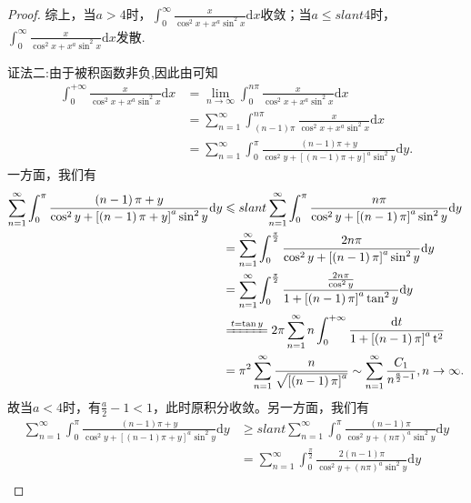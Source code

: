 \documentclass[../../main.tex]{subfiles}
\begin{document}
\begin{proof}
综上，当$a>4$时，$\int_0^{\infty}\frac{x}{\cos^2x+x^a\sin^2x}\mathrm{d}x$收敛；当$a\leqslant slant 4$时，$\int_0^{\infty}\frac{x}{\cos^2x+x^a\sin^2x}\mathrm{d}x$发散.

{\color{blue}证法二:}由于被积函数非负,因此由可知
\begin{align*}
\int_0^{+\infty}{\frac{x}{\cos ^2x+x^a\sin ^2x}\mathrm{d}x}&=\underset{n\rightarrow \infty}{\lim}\int_0^{n\pi}{\frac{x}{\cos ^2x+x^a\sin ^2x}\mathrm{d}x}
\\
&=\sum_{n=1}^{\infty}{\int_{\left( n-1 \right) \pi}^{n\pi}{\frac{x}{\cos ^2x+x^a\sin ^2x}\mathrm{d}x}}
\\
&=\sum_{n=1}^{\infty}{\int_0^{\pi}{\frac{\left( n-1 \right) \pi +y}{\cos ^2y+\left[ \left( n-1 \right) \pi +y \right] ^a\sin ^2y}\mathrm{d}y}}.
\end{align*}
一方面，我们有
\begin{align*}
\sum_{n=1}^{\infty}{\int_0^{\pi}{\frac{\left( n-1 \right) \pi +y}{\cos ^2y+\left[ \left( n-1 \right) \pi +y \right] ^a\sin ^2y}\mathrm{d}y}}&\leqslant slant \sum_{n=1}^{\infty}{\int_0^{\pi}{\frac{n\pi}{\cos ^2y+\left[ \left( n-1 \right) \pi \right] ^a\sin ^2y}\mathrm{d}y}}\\
&=\sum_{n=1}^{\infty}{\int_0^{\frac{\pi}{2}}{\frac{2n\pi}{\cos ^2y+\left[ \left( n-1 \right) \pi \right] ^a\sin ^2y}\mathrm{d}y}}\\
&=\sum_{n=1}^{\infty}{\int_0^{\frac{\pi}{2}}{\frac{\frac{2n\pi}{\cos ^2y}}{1+\left[ \left( n-1 \right) \pi \right] ^a\tan ^2y}\mathrm{d}y}}
\\
&\xlongequal{t=\tan y}2\pi \sum_{n=1}^{\infty}{n\int_0^{+\infty}{\frac{\mathrm{d}t}{1+\left[ \left( n-1 \right) \pi \right] ^a\mathrm{t}^2}}}\\
&=\pi ^2\sum_{n=1}^{\infty}{\frac{n}{\sqrt{\left[ \left( n-1 \right) \pi \right] ^a}}}\sim \sum_{n=1}^{\infty}{\frac{C_1}{n^{\frac{a}{2}-1}}},n\rightarrow \infty .
\end{align*}
故当$a<4$时，有$\frac{a}{2}-1<1$，此时原积分收敛。另一方面，我们有
\begin{align*}
\sum_{n=1}^{\infty}{\int_0^{\pi}{\frac{\left( n-1 \right) \pi +y}{\cos ^2y+\left[ \left( n-1 \right) \pi +y \right] ^a\sin ^2y}\mathrm{d}y}}&\geqslant slant \sum_{n=1}^{\infty}{\int_0^{\pi}{\frac{\left( n-1 \right) \pi}{\cos ^2y+\left( n\pi \right) ^a\sin ^2y}\mathrm{d}y}}\\
&=\sum_{n=1}^{\infty}{\int_0^{\frac{\pi}{2}}{\frac{2\left( n-1 \right) \pi}{\cos ^2y+\left( n\pi \right) ^a\sin ^2y}\mathrm{d}y}}\\

\end{align*}
\end{proof}
\end{document}
